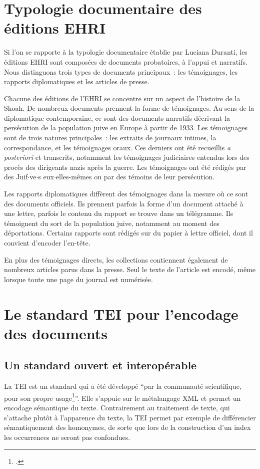 \section{Typologie documentaire des éditions EHRI}
Si l'on se rapporte à la typologie documentaire établie par Luciana Duranti, les éditions EHRI sont composées de documents probatoires, à l'appui et narratifs. Nous distinguons trois types de documents principaux~: les témoignages, les rapports diplomatiques et les articles de presse.  

Chacune des éditions de l'EHRI se concentre sur un aspect de l'histoire de la Shoah. De nombreux documents prennent la forme de témoignages. Au sens de la diplomatique contemporaine, ce sont des documents narratifs décrivant la persécution de la population juive en Europe à partir de 1933. Les témoignages sont de trois natures principales~: les extraits de journaux intimes, la correspondance, et les témoignages oraux. Ces derniers ont été recueillis \textit{a posteriori} et transcrits, notamment les témoignages judiciaires entendus lors des procès des dirigeants nazis après la guerre. Les témoignages ont été rédigés par des Juif$\cdot$ve$\cdot$s eux$\cdot$elles-mêmes ou par des témoins de leur persécution.

Les rapports diplomatiques diffèrent des témoignages dans la mesure où ce sont des documents officiels. Ils prennent parfois la forme d'un document attaché à une lettre, parfois le contenu du rapport se trouve dans un télégramme. Ils témoignent du sort de la population juive, notamment au moment des déportations. Certains rapports sont rédigés sur du papier à lettre officiel, dont il convient d'encoder l'en-tête.  

En plus des témoignages directs, les collections contiennent également de nombreux articles parus dans la presse. Seul le texte de l'article est encodé, même lorsque toute une page du journal est numérisée.  



\section{Le standard TEI pour l'encodage des documents}

\subsection{Un standard ouvert et interopérable}
La TEI est un standard qui a été développé \enquote{par la communauté scientifique, pour son propre usage\footcite{Burnard2015}}. Elle s'appuie sur le métalangage XML et permet un encodage sémantique du texte. Contrairement au traitement de texte, qui s'attache plutôt à l'apparence du texte, la TEI permet par exemple de différencier sémantiquement des homonymes, de sorte que lors de la construction d'un index les occurrences ne seront pas confondues.  

